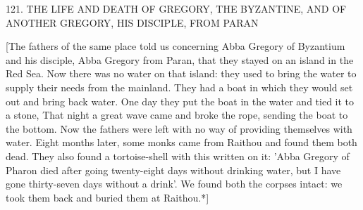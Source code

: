 121.
THE LIFE AND DEATH OF GREGORY,
THE BYZANTINE, AND OF ANOTHER GREGORY,
HIS DISCIPLE, FROM PARAN

[The fathers of the same place told us concerning Abba Gregory of
Byzantium and his disciple, Abba Gregory from Paran, that they
stayed on an island in the Red Sea.
Now there was no water on that
island: they used to bring the water to supply their needs from the
mainland.
They had a boat in which they would set out and bring
back water.
One day they put the boat in the water and tied it to a
stone, That night a great wave came and broke the rope, sending
the boat to the bottom.
Now the fathers were left with no way of
providing themselves with water.
Eight months later, some monks
came from Raithou and found them both dead.
They also found a
tortoise-shell with this written on it: 'Abba Gregory of Pharon died
after going twenty-eight days without drinking water, but I have
gone thirty-seven days without a drink'.
We found both the corpses
intact: we took them back and buried them at Raithou.*]

